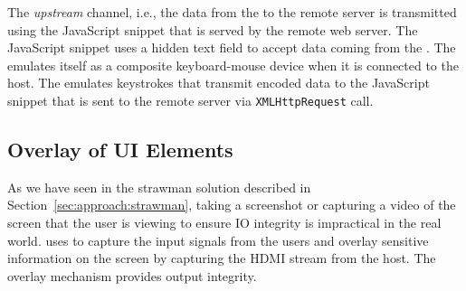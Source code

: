 The \emph{upstream} channel, i.e., the data from the \device to the remote server is transmitted using the \name JavaScript snippet that is served by the remote web server. The \name JavaScript snippet uses a hidden text field to accept data coming from the \device. The \device emulates itself as a composite keyboard-mouse device when it is connected to the host. The \device emulates keystrokes that transmit encoded data to the \name JavaScript snippet that is sent to the remote server via \texttt{XMLHttpRequest} call.
\fi





\subsection{\device Overlay of UI Elements}
\label{sec:systemDesign:transformation}

As we have seen in the strawman solution described in Section~\ref{sec:approach:strawman}, taking a screenshot or capturing a video of the screen that the user is viewing to ensure IO integrity is impractical in the real world. \name uses \device to capture the input signals from the users and overlay sensitive information on the screen by capturing the HDMI stream from the host. The overlay mechanism provides output integrity.


